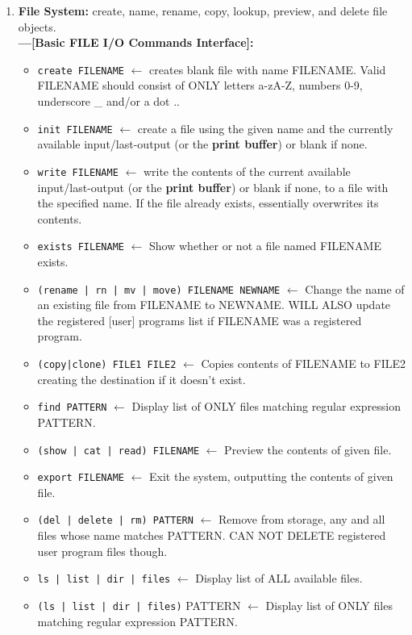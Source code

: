 \documentclass[a4paper, 18pt]{book} %
\begin{document}
{{{\begin{enumerate}
\item {  \textbf{File System:} create, name, rename, copy, lookup, preview, and delete file objects.\\
\textbf{---[Basic FILE I/O Commands Interface]:}
\begin{itemize}
\item \texttt{create FILENAME} $\leftarrow$ creates blank file with name FILENAME. Valid FILENAME should consist of ONLY letters a-zA-Z, numbers 0-9, underscore \_ and/or a dot ..
\item \texttt{init FILENAME} $\leftarrow$ create a file using the given name and the currently available input/last-output (or the \textbf{print buffer}) or blank if none.
\item \texttt{write FILENAME} $\leftarrow$ write the contents of the current available input/last-output (or the \textbf{print buffer}) or blank if none, to a file with the specified name. If the file already exists, essentially overwrites its contents.
\item \texttt{exists FILENAME} $\leftarrow$ Show whether or not a file named FILENAME exists.
\item \texttt{(rename | rn | mv | move) FILENAME NEWNAME} $\leftarrow$ Change the name of an existing file from FILENAME to NEWNAME. WILL ALSO update the registered [user] programs list if FILENAME was a registered program.
\item \texttt{(copy|clone) FILE1 FILE2} $\leftarrow$ Copies contents of FILENAME to FILE2 creating the destination if it doesn't exist.
\item \texttt{find PATTERN} $\leftarrow$ Display list of ONLY files matching regular expression PATTERN.
\item \texttt{(show | cat | read) FILENAME} $\leftarrow$ Preview the contents of given file.
\item \texttt{export FILENAME} $\leftarrow$ Exit the system, outputting the contents of given file.
\item \texttt{(del | delete | rm) PATTERN} $\leftarrow$ Remove from storage, any and all files whose name matches PATTERN. CAN NOT DELETE registered user program files though.
\item \texttt{ls | list | dir | files} $\leftarrow$ Display list of ALL available files.
\item \texttt{(ls | list | dir | files)} PATTERN $\leftarrow$ Display list of ONLY files matching regular expression PATTERN.
\end{itemize}

}
\end{enumerate}}}}
\end{document}
